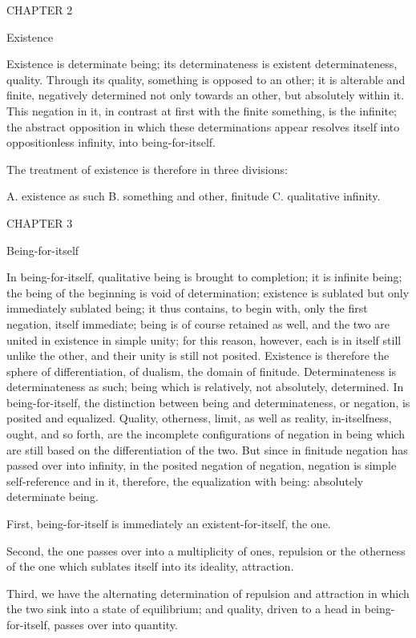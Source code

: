 CHAPTER 2

Existence

Existence is determinate being;
its determinateness is existent determinateness, quality.
Through its quality, something is opposed to an other;
it is alterable and finite,
negatively determined not only towards an other,
but absolutely within it.
This negation in it, in contrast at first
with the finite something, is the infinite;
the abstract opposition in which these determinations appear
resolves itself into oppositionless infinity,
into being-for-itself.

The treatment of existence is therefore in three divisions:

A. existence as such
B. something and other, finitude
C. qualitative infinity.

CHAPTER 3

Being-for-itself

In being-for-itself,
qualitative being is brought to completion;
it is infinite being;
the being of the beginning is void of determination;
existence is sublated but only immediately sublated being;
it thus contains, to begin with,
only the first negation, itself immediate;
being is of course retained as well,
and the two are united in existence in simple unity;
for this reason, however, each is in itself still unlike the other,
and their unity is still not posited.
Existence is therefore the sphere of differentiation,
of dualism, the domain of finitude.
Determinateness is determinateness as such;
being which is relatively, not absolutely, determined.
In being-for-itself, the distinction
between being and determinateness,
or negation, is posited and equalized.
Quality, otherness, limit, as well as reality, in-itselfness,
ought, and so forth, are the incomplete configurations of negation in being
which are still based on the differentiation of the two.
But since in finitude negation has passed over into infinity,
in the posited negation of negation,
negation is simple self-reference
and in it, therefore, the equalization with being:
absolutely determinate being.

First, being-for-itself is immediately
an existent-for-itself, the one.

Second, the one passes over into a multiplicity of ones,
repulsion or the otherness of the one
which sublates itself into its ideality, attraction.

Third, we have the alternating determination of repulsion and attraction
in which the two sink into a state of equilibrium;
and quality, driven to a head in being-for-itself,
passes over into quantity.

